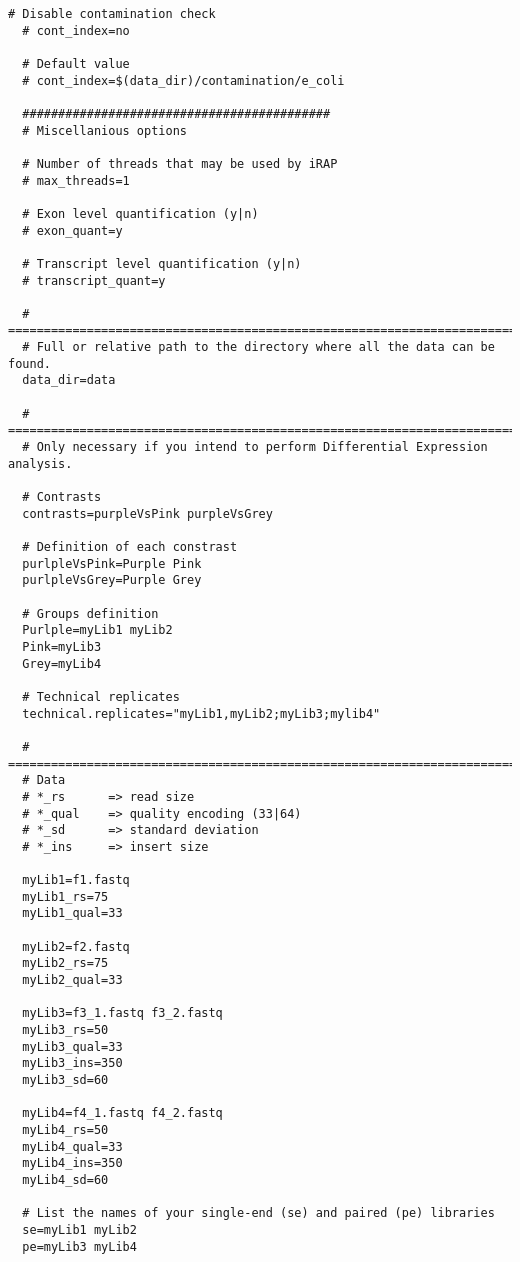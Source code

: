 \begin{lstlisting}[numbers=none, breaklines=true]
  # Disable contamination check
  # cont_index=no

  # Default value
  # cont_index=$(data_dir)/contamination/e_coli

  ###########################################
  # Miscellanious options

  # Number of threads that may be used by iRAP
  # max_threads=1

  # Exon level quantification (y|n)
  # exon_quant=y

  # Transcript level quantification (y|n)
  # transcript_quant=y

  # =============================================================================
  # Full or relative path to the directory where all the data can be found.
  data_dir=data

  # =============================================================================
  # Only necessary if you intend to perform Differential Expression analysis.

  # Contrasts
  contrasts=purpleVsPink purpleVsGrey

  # Definition of each constrast
  purlpleVsPink=Purple Pink
  purlpleVsGrey=Purple Grey

  # Groups definition
  Purlple=myLib1 myLib2
  Pink=myLib3
  Grey=myLib4

  # Technical replicates
  technical.replicates="myLib1,myLib2;myLib3;mylib4"

  # =============================================================================
  # Data
  # *_rs      => read size
  # *_qual    => quality encoding (33|64)
  # *_sd      => standard deviation
  # *_ins     => insert size

  myLib1=f1.fastq
  myLib1_rs=75
  myLib1_qual=33

  myLib2=f2.fastq
  myLib2_rs=75
  myLib2_qual=33

  myLib3=f3_1.fastq f3_2.fastq
  myLib3_rs=50
  myLib3_qual=33
  myLib3_ins=350
  myLib3_sd=60

  myLib4=f4_1.fastq f4_2.fastq
  myLib4_rs=50
  myLib4_qual=33
  myLib4_ins=350
  myLib4_sd=60

  # List the names of your single-end (se) and paired (pe) libraries
  se=myLib1 myLib2
  pe=myLib3 myLib4
\end{lstlisting}
